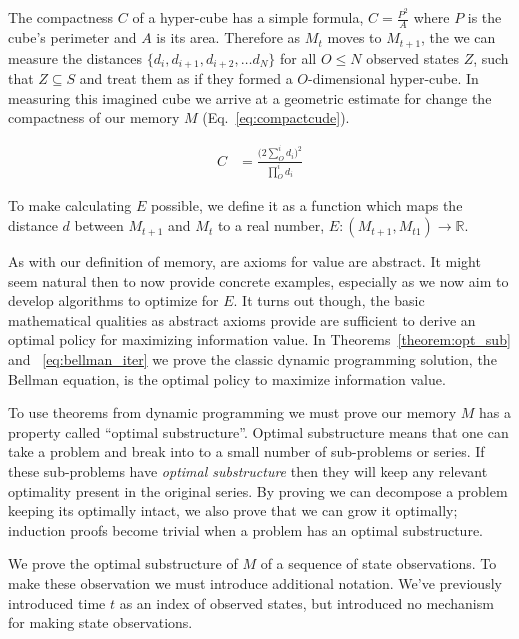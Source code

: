 \documentclass[9pt,twocolumn,twoside]{pnas-new}
\begin{document}
\\ \\
The compactness $C$ of a hyper-cube has a simple formula, $C = \frac{P^2}{A}$ where $P$ is the cube's perimeter and $A$ is its area. Therefore as $M_{t}$ moves to $M_{t+1}$, the we can measure the distances $\{d_i, d_{i+1}, d_{i+2},\ldots d_{N}\}$ for all $O \leq N$ observed states $Z$, such that $Z \subseteq S$ and treat them as if they formed a $O$-dimensional hyper-cube. In measuring this imagined cube we arrive at a geometric estimate for change the compactness of our memory $M$ (Eq.~\ref{eq:compactcude}).

\begin{equation} \label{eq:compactcude}
\begin{split}
    C & = \frac{\Big ( 2 \sum_{O}^{i} d_i \Big )^2}{\prod_{O}^{i} d_i}
\end{split}
\end{equation}


To make calculating $E$ possible, we define it as a function which maps the distance $d$ between $M_{t+1}$ and $M_{t}$ to a real number, $E: (M_{t+1}, M_{t1}) \rightarrow \mathbb{R}$.

As with our definition of memory, are axioms for value are abstract. It might seem natural then to now provide concrete examples, especially as we now aim to develop algorithms to optimize for $E$. It turns out though, the basic mathematical qualities as abstract axioms provide are sufficient to derive an optimal policy for maximizing information value. In Theorems~\ref{theorem:opt_sub} and ~\ref{eq:bellman_iter} we prove the classic dynamic programming solution, the Bellman equation, is the optimal policy to maximize information value. 


To use theorems from dynamic programming we must prove our memory $M$ has a property called ``optimal substructure''. Optimal substructure means that one can take a problem and break into to a small number of sub-problems or series. If these sub-problems have \textit{optimal substructure} then they will keep any relevant optimality present in the original series. By proving we can decompose a problem keeping its optimally intact, we also prove that we can grow it optimally; induction proofs become trivial when a problem has an optimal substructure.

We prove the optimal substructure of $M$ of a sequence of state observations. To make these observation we must introduce additional notation. We've previously introduced time $t$ as an index of observed states, but introduced no mechanism for making state observations. 
\end{document}
